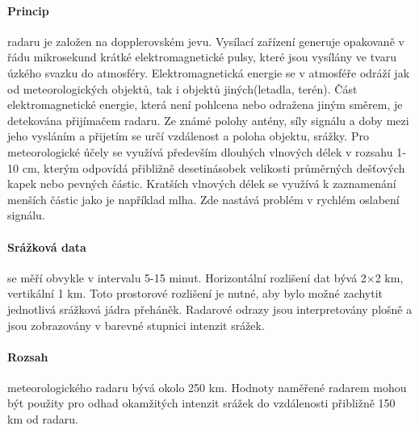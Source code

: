 \documentclass[a4paper,12pt]{article}
\begin{document}
\paragraph*{Princip}
radaru je založen na dopplerovském jevu.\cite{radar_meterology} Vysílací zařízení generuje opakovaně v řádu mikrosekund krátké elektromagnetické pulsy, které jsou vysílány ve tvaru úzkého svazku do atmosféry. Elektromagnetická energie se v atmosféře odráží jak od meteorologických objektů, tak i objektů jiných(letadla, terén). Část elektromagnetické energie, která není pohlcena nebo odražena jiným směrem, je detekována přijímačem radaru. Ze známé polohy antény, síly signálu a doby mezi jeho vysláním a přijetím se určí vzdálenost a poloha objektu, srážky. 
Pro meteorologické účely se využívá především dlouhých vlnových délek v rozsahu 1-10 cm, kterým odpovídá přibližně desetinásobek velikosti průměrných dešťových kapek nebo pevných částic. Kratších vlnových délek se využívá k zaznamenání menších částic jako je například mlha. Zde nastává problém v rychlém oslabení signálu.\cite{doppler}

\paragraph*{Srážková data}se měří obvykle v intervalu 5-15 minut. Horizontální rozlišení dat bývá 2×2 km, vertikální 1 km. Toto prostorové rozlišení je nutné, aby bylo možné zachytit jednotlivá srážková jádra přeháněk. Radarové odrazy jsou interpretovány plošně a jsou zobrazovány v barevné stupnici intenzit srážek.
\paragraph*{Rozsah} meteorologického radaru bývá okolo 250 km. Hodnoty naměřené radarem mohou být použity pro odhad okamžitých intenzit srážek do vzdálenosti přibližně 150 km od radaru.\cite{kohout}
\end{document}
